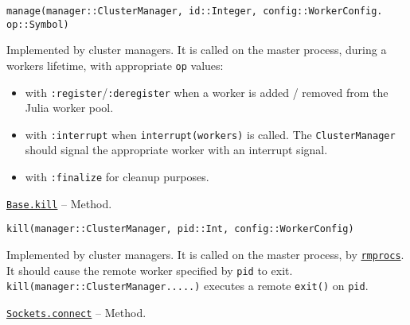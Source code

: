 \begin{adjustwidth}{2em}{0pt}


\begin{verbatim}
manage(manager::ClusterManager, id::Integer, config::WorkerConfig. op::Symbol)
\end{verbatim}

Implemented by cluster managers. It is called on the master process, during a worker{\textquotesingle}s lifetime, with appropriate \texttt{op} values:

\begin{itemize}
\item with \texttt{:register}/\texttt{:deregister} when a worker is added / removed from the Julia worker pool.


\item with \texttt{:interrupt} when \texttt{interrupt(workers)} is called. The \texttt{ClusterManager} should signal the appropriate worker with an interrupt signal.


\item with \texttt{:finalize} for cleanup purposes.

\end{itemize}


\end{adjustwidth}
\hypertarget{17836284879339877528}{} 
\hyperlink{17836284879339877528}{\texttt{Base.kill}}  -- {Method.}

\begin{adjustwidth}{2em}{0pt}


\begin{verbatim}
kill(manager::ClusterManager, pid::Int, config::WorkerConfig)
\end{verbatim}

Implemented by cluster managers. It is called on the master process, by \hyperlink{16165500032398890398}{\texttt{rmprocs}}. It should cause the remote worker specified by \texttt{pid} to exit. \texttt{kill(manager::ClusterManager.....)} executes a remote \texttt{exit()} on \texttt{pid}.



\end{adjustwidth}
\hypertarget{9743233285520657275}{} 
\hyperlink{9743233285520657275}{\texttt{Sockets.connect}}  -- {Method.}

